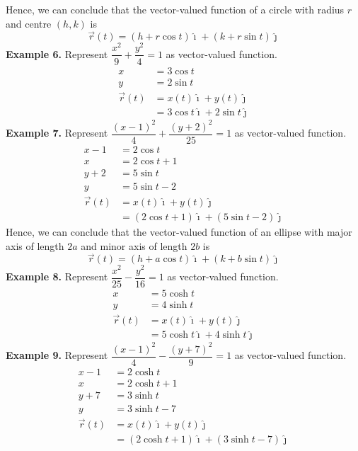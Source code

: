 \documentclass{report}
\begin{document}
Hence, we can conclude that the vector-valued function of a circle with radius $r$ and centre $(h, k)$ is \[\vec{r}(t) = (h + r\cos{t})\hat{\imath} + (k + r\sin{t})\hat{\jmath}\]
\noindent\textbf{Example 6. } Represent $\dfrac{x^2}{9}+ \dfrac{y^2}{4} = 1$ as vector-valued function.
\begin{align*}
    x          & = 3\cos{t}                                    \\
    y          & = 2\sin{t}                                    \\
    \vec{r}(t) & = x(t)\hat{\imath} + y(t)\hat{\jmath}         \\
               & = 3\cos{t}\hat{\imath} + 2\sin{t}\hat{\jmath}
\end{align*}
\noindent\textbf{Example 7. } Represent $\dfrac{(x-1)^2}{4}+ \dfrac{(y+2)^2}{25} = 1$ as vector-valued function.
\begin{align*}
    x - 1      & = 2\cos{t}                                                \\
    x          & = 2\cos{t} + 1                                            \\
    y + 2      & = 5\sin{t}                                                \\
    y          & = 5\sin{t} - 2                                            \\
    \vec{r}(t) & = x(t)\hat{\imath} + y(t)\hat{\jmath}                     \\
               & = (2\cos{t} + 1)\hat{\imath} + (5\sin{t} - 2)\hat{\jmath}
\end{align*}
Hence, we can conclude that the vector-valued function of an ellipse with major axis of length $2a$ and minor axis of length $2b$ is \[\vec{r}(t) = (h + a\cos{t})\hat{\imath} + (k + b\sin{t})\hat{\jmath}\]
\noindent\textbf{Example 8. } Represent $\dfrac{x^2}{25} - \dfrac{y^2}{16} = 1$ as vector-valued function.
\begin{align*}
    x          & = 5\cosh{t}                                     \\
    y          & = 4\sinh{t}                                     \\
    \vec{r}(t) & = x(t)\hat{\imath} + y(t)\hat{\jmath}           \\
               & = 5\cosh{t}\hat{\imath} + 4\sinh{t}\hat{\jmath}
\end{align*}
\noindent\textbf{Example 9. } Represent $\dfrac{(x-1)^2}{4} - \dfrac{(y+7)^2}{9} = 1$ as vector-valued function.
\begin{align*}
    x - 1      & = 2\cosh{t}                                                 \\
    x          & = 2\cosh{t} + 1                                             \\
    y + 7      & = 3\sinh{t}                                                 \\
    y          & = 3\sinh{t} - 7                                             \\
    \vec{r}(t) & = x(t)\hat{\imath} + y(t)\hat{\jmath}                       \\
               & = (2\cosh{t} + 1)\hat{\imath} + (3\sinh{t} - 7)\hat{\jmath}
\end{align*}
\end{document}
